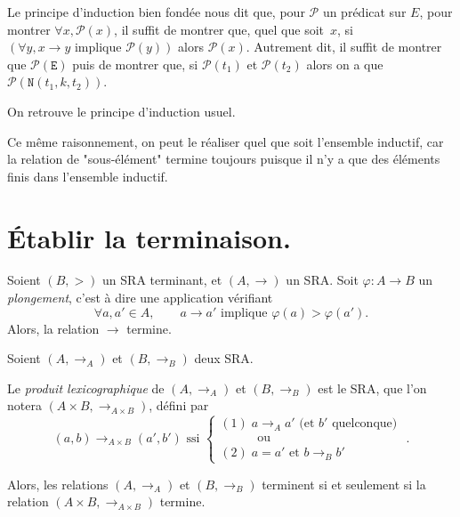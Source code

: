 \documentclass[../main]{subfiles}
\begin{document}
  Le principe d'induction bien fondée nous dit que, pour $\mathcal{P}$ un prédicat sur $E$, pour montrer $\forall x, \mathcal{P}(x)$, il suffit de montrer que, quel que soit~$x$, si $(\forall y, x \to y \text{ implique } \mathcal{P}(y))$ alors $\mathcal{P}(x)$.
  Autrement dit, il suffit de montrer que $\mathcal{P}(\mathtt{E})$ puis de montrer que, si $\mathcal{P}(t_1)$ et $\mathcal{P}(t_2)$ alors on a que~$\mathcal{P}(\mathtt{N}(t_1, k, t_2))$.

  On retrouve le principe d'induction usuel.

  Ce même raisonnement, on peut le réaliser quel que soit l'ensemble inductif, car la relation de "sous-élément" termine toujours puisque il n'y a que des éléments finis dans l'ensemble inductif.

  \section{Établir la terminaison.}

  \begin{thm}
    Soient $(B, >)$ un SRA terminant, et $(A, \to)$ un SRA.
    Soit $\varphi : A \to B$ un \textit{plongement}, c'est à dire une application vérifiant \[
    \forall a, a' \in A, \quad\quad a \to a' \text{ implique } \varphi(a) > \varphi(a')
    .\]
    Alors, la relation $\to$ termine.
  \end{thm}

  \begin{thm}
    Soient $(A, \to_A)$ et $(B, \to_B)$ deux SRA.

    Le \textit{produit lexicographique} de $(A, \to_A)$ et $(B, \to_B)$ est le SRA, que l'on notera $(A \times B, \to_{A \times B})$, défini par \[
      (a, b) \to_{A \times B} (a', b') \text{ ssi } \begin{cases}
        (1) \; a \to_A a' \text{ (et $b'$ quelconque) }\\[-0.2em]
        \quad\quad\quad\text{ou}\\[-0.2em]
        (2)\; a = a' \text{ et } b \to_B b'
      \end{cases}
    .\]

    Alors, les relations $(A, \to_A)$ et $(B, \to_B)$ terminent si et seulement si la relation $(A \times B, \to_{A \times B})$ termine.
  \end{thm}
\end{document}
